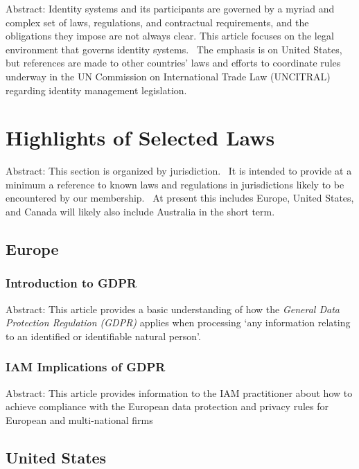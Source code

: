 Abstract: Identity systems and its participants are governed by a myriad
and complex set of laws, regulations, and contractual requirements, and
the obligations they impose are not always clear. This article focuses
on the legal environment that governs identity systems.~ The emphasis is
on United States, but references are made to other countries' laws and
efforts to coordinate rules underway in the UN Commission on
International Trade Law (UNCITRAL) regarding identity management
legislation.

\hypertarget{highlights-of-selected-laws}{%
\section{Highlights of Selected
Laws}\label{highlights-of-selected-laws}}

Abstract: This section is organized by jurisdiction.~ It is intended to
provide at a minimum a reference to known laws and regulations in
jurisdictions likely to be encountered by our membership.~ At present
this includes Europe, United States, and Canada will likely also include
Australia in the short term.

\hypertarget{europe}{%
\subsection{Europe}\label{europe}}

\hypertarget{introduction-to-gdpr}{%
\subsubsection{Introduction to GDPR}\label{introduction-to-gdpr}}

Abstract: This article provides a basic understanding of how the
\emph{General Data Protection Regulation (GDPR)} applies when processing
`any information relating to an identified or identifiable natural
person'.

\hypertarget{iam-implications-of-gdpr}{%
\subsubsection{IAM Implications of GDPR}\label{iam-implications-of-gdpr}}

Abstract: This article provides information to the IAM practitioner
about how to achieve compliance with the European data protection and
privacy rules for European and multi-national firms

\hypertarget{united-states}{%
\subsection{United States}\label{united-states}}

